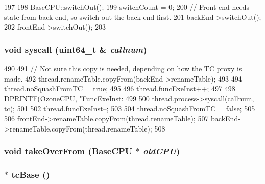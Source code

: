 \begin{DoxyCode}
197 {
198     BaseCPU::switchOut();
199     switchCount = 0;
200     // Front end needs state from back end, so switch out the back end first.
201     backEnd->switchOut();
202     frontEnd->switchOut();
203 }
\end{DoxyCode}
\hypertarget{classOzoneCPU_afb9b1cbbf52b94f9a2da780a3cc4586b}{
\subsubsection[{syscall}]{\setlength{\rightskip}{0pt plus 5cm}void syscall (uint64\_\-t \& {\em callnum})}}
\label{classOzoneCPU_afb9b1cbbf52b94f9a2da780a3cc4586b}



\begin{DoxyCode}
490 {
491     // Not sure this copy is needed, depending on how the TC proxy is made.
492     thread.renameTable.copyFrom(backEnd->renameTable);
493 
494     thread.noSquashFromTC = true;
495 
496     thread.funcExeInst++;
497 
498     DPRINTF(OzoneCPU, "FuncExeInst: %
499 
500     thread.process->syscall(callnum, tc);
501 
502     thread.funcExeInst--;
503 
504     thread.noSquashFromTC = false;
505 
506     frontEnd->renameTable.copyFrom(thread.renameTable);
507     backEnd->renameTable.copyFrom(thread.renameTable);
508 }
\end{DoxyCode}
\hypertarget{classOzoneCPU_ac82d2b8d331b2e8e6854a95d2917dfa2}{
\subsubsection[{takeOverFrom}]{\setlength{\rightskip}{0pt plus 5cm}void takeOverFrom ({\bf BaseCPU} $\ast$ {\em oldCPU})}}
\label{classOzoneCPU_ac82d2b8d331b2e8e6854a95d2917dfa2}
\hypertarget{classOzoneCPU_ad33756f3e96ee445dca8d69b1dd8709c}{
\subsubsection[{tcBase}]{$\ast$ tcBase ()}}
\label{classOzoneCPU_ad33756f3e96ee445dca8d69b1dd8709c}




